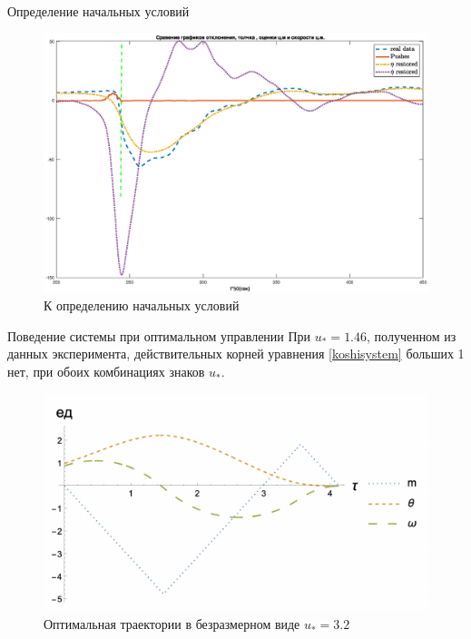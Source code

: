 \documentclass[10pt]{beamer}
\begin{document}
\begin{frame}{Определение начальных условий}
	\begin{figure}[h!]
		\centering
		\includegraphics[width=1\linewidth]{images/full_init.eps}
		\caption{К определению начальных условий}
		\label{restore_double_real}
	\end{figure}
\end{frame}

\begin{frame}{Поведение системы при оптимальном управлении}
	При $u_\ast=1.46$, полученном из данных эксперимента, действительных корней уравнения \eqref{koshisystem} больших 1 нет,
	при обоих комбинациях знаков $u_\ast$.
	\begin{figure}[h!]
		\centering
		\includegraphics[width=0.7\linewidth]{3_graphs.png}
		\caption{Оптимальная траектории в безразмерном виде $u_\ast=3.2$ }
		\label{3_graphs}
	\end{figure}
\end{frame}
\end{document}
